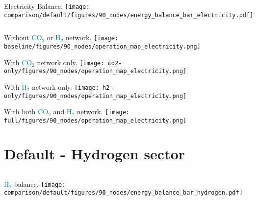 \documentclass[12pt, aspectratio=169]{beamer}
\newcommand{\carbon}{\textcolor{teal}{CO$_2$}}
\newcommand{\hydrogen}{\textcolor{teal}{H$_2$}}
\begin{document}
\begin{frame}
    \begin{columns}
        Electricity Balance.
        \texttt{[image: comparison/default/figures/90\_nodes/energy\_balance\_bar\_electricity.pdf]}
    \end{columns}
\end{frame}

\begin{frame}
    \begin{center}
    Without \carbon{} or \hydrogen{} network.
    \texttt{[image: baseline/figures/90\_nodes/operation\_map\_electricity.png]}
    \end{center}
\end{frame}


\begin{frame}
    \begin{center}
    With \carbon{} network only.
    \texttt{[image: co2-only/figures/90\_nodes/operation\_map\_electricity.png]}
    \end{center}
\end{frame}

\begin{frame}
    \begin{center}
    With \hydrogen{} network only.
    \texttt{[image: h2-only/figures/90\_nodes/operation\_map\_electricity.png]}
    \end{center}
\end{frame}

\begin{frame}
    \begin{center}
    With both \carbon{}  and \hydrogen{} network.
    \texttt{[image: full/figures/90\_nodes/operation\_map\_electricity.png]}
    \end{center}
\end{frame}

\section*{Default - Hydrogen sector}

\begin{frame}
    \begin{columns}
        \hydrogen{} balance.
        \texttt{[image: comparison/default/figures/90\_nodes/energy\_balance\_bar\_hydrogen.pdf]}
    \end{columns}
\end{frame}
\end{document}
